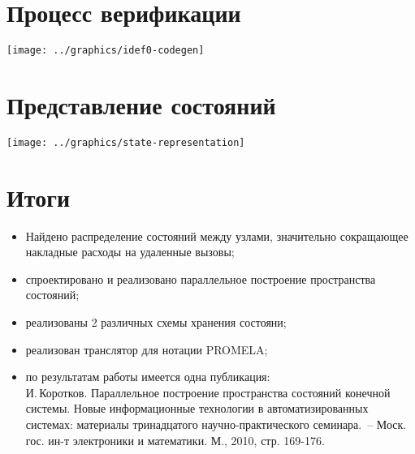 \documentclass[12pt]{article}
\begin{document}



\section{Процесс верификации}
\label{sec:idef0}

\begin{center}
  \texttt{[image: ../graphics/idef0-codegen]}
\end{center}

\section{Представление состояний}
\label{sec:state-represent}

\begin{center}
  \texttt{[image: ../graphics/state-representation]}
\end{center}

\section{Итоги}
\label{sec:publications}

\small
\begin{itemize}
\item Найдено распределение состояний между узлами, значительно сокращающее накладные
  расходы на удаленные вызовы;
\item спроектировано и реализовано параллельное построение пространства состояний;
\item реализованы 2 различных схемы хранения состояни;
\item реализован транслятор для нотации PROMELA;
\item по результатам работы имеется одна публикация: \\ И.\,Коротков. Параллельное
  построение пространства состояний конечной системы. Новые информационные технологии в
  автоматизированных системах: материалы тринадцатого научно-практического семинара.~--
  Моск. гос. ин-т электроники и математики. М., 2010, стр. 169-176.
\end{itemize}
\normalsize
\end{document}
